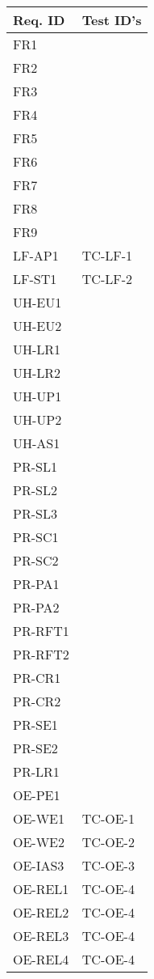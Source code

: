 \documentclass[12pt, titlepage]{article}
\begin{document}
\begin{longtable}{|l|l|}
  \hline
  \textbf{Req. ID} & \textbf{Test ID's} \\
  \hline
  FR1 & \\ \hline
  FR2 & \\ \hline
  FR3 & \\ \hline
  FR4 & \\ \hline
  FR5 & \\ \hline
  FR6 & \\ \hline
  FR7 & \\ \hline
  FR8 & \\ \hline
  FR9 & \\ \hline
  LF-AP1 & TC-LF-1 \\ \hline
  LF-ST1 & TC-LF-2 \\ \hline
  UH-EU1 & \\ \hline
  UH-EU2 & \\ \hline
  UH-LR1 & \\ \hline
  UH-LR2 & \\ \hline
  UH-UP1 & \\ \hline
  UH-UP2 & \\ \hline
  UH-AS1 & \\ \hline
  PR-SL1 & \\ \hline
  PR-SL2 & \\ \hline
  PR-SL3 & \\ \hline
  PR-SC1 & \\ \hline
  PR-SC2 & \\ \hline
  PR-PA1 & \\ \hline
  PR-PA2 & \\ \hline
  PR-RFT1 & \\ \hline
  PR-RFT2 & \\ \hline
  PR-CR1 & \\ \hline
  PR-CR2 & \\ \hline
  PR-SE1 & \\ \hline
  PR-SE2 & \\ \hline
  PR-LR1 & \\ \hline
  OE-PE1 & \\ \hline
  OE-WE1 & TC-OE-1 \\ \hline
  OE-WE2 & TC-OE-2 \\ \hline
  OE-IAS3 & TC-OE-3 \\ \hline
  OE-REL1 & TC-OE-4 \\ \hline
  OE-REL2 & TC-OE-4 \\ \hline
  OE-REL3 & TC-OE-4 \\ \hline
  OE-REL4 & TC-OE-4 \\ \hline

\end{longtable}
\end{document}

